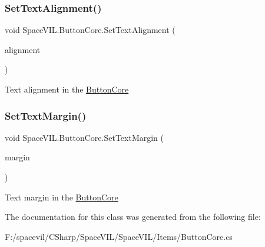 \subsubsection{\texorpdfstring{Set\+Text\+Alignment()}{SetTextAlignment()}}
{\footnotesize\ttfamily void Space\+V\+I\+L.\+Button\+Core.\+Set\+Text\+Alignment (\begin{DoxyParamCaption}\item[{Item\+Alignment}]{alignment }\end{DoxyParamCaption})\hspace{0.3cm}{\ttfamily [inline]}}



Text alignment in the \mbox{\hyperlink{class_space_v_i_l_1_1_button_core}{Button\+Core}} 

\mbox{\label{class_space_v_i_l_1_1_button_core_ad1d215401ec59acf1c54cfa036606b0f}} 
\subsubsection{\texorpdfstring{Set\+Text\+Margin()}{SetTextMargin()}}
{\footnotesize\ttfamily void Space\+V\+I\+L.\+Button\+Core.\+Set\+Text\+Margin (\begin{DoxyParamCaption}\item[{\mbox{\hyperlink{struct_space_v_i_l_1_1_decorations_1_1_indents}{Indents}}}]{margin }\end{DoxyParamCaption})\hspace{0.3cm}{\ttfamily [inline]}}



Text margin in the \mbox{\hyperlink{class_space_v_i_l_1_1_button_core}{Button\+Core}} 



The documentation for this class was generated from the following file\+:\begin{DoxyCompactItemize}
\item 
F\+:/spacevil/\+C\+Sharp/\+Space\+V\+I\+L/\+Space\+V\+I\+L/\+Items/Button\+Core.\+cs\end{DoxyCompactItemize}
